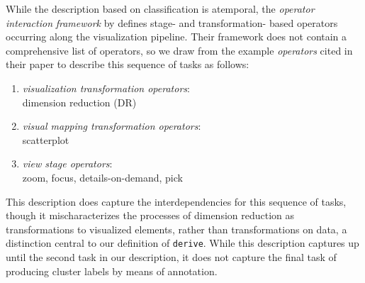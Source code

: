While the description based on \citet{Chuah1996} classification is atemporal, the {\it operator} {\it interaction} {\it framework} by \citet{Chi1998} defines stage- and transformation- based operators occurring along the visualization pipeline.
Their framework does not contain a comprehensive list of operators, so we draw from the example {\it operators} cited in their paper to describe this sequence of tasks as follows:


\begin{enumerate}
    \item {\it visualization transformation operators}: \\
    dimension reduction (\ac{DR})
    
    \item {\it visual mapping transformation operators}: \\
    scatterplot
    
    \item {\it view stage operators}: \\
    zoom, focus, details-on-demand, pick

\end{enumerate}


This description does capture the interdependencies for this sequence of tasks, though it mischaracterizes the processes of dimension reduction as transformations to visualized elements, rather than transformations on data, a distinction central to our definition of {\tt derive}.
While this description captures up until the second task in our description, it does not capture the final task of producing cluster labels by means of annotation.

